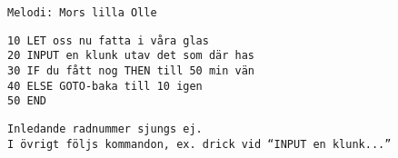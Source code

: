 {\small{\scriptsize\texttt{Melodi: Mors lilla Olle}}\par
\vspace{10pt}
\texttt{10 LET oss nu fatta i våra glas}\\
\texttt{20 INPUT en klunk utav det som där has}\\
\texttt{30 IF du fått nog THEN till 50 min vän}\\
\texttt{40 ELSE GOTO-baka till 10 igen}\\
\texttt{50 END}\par
\vspace{10pt}
{\scriptsize\texttt{Inledande radnummer sjungs ej.\\ I övrigt följs
    kommandon, ex. drick vid ``INPUT en klunk...''}}}
